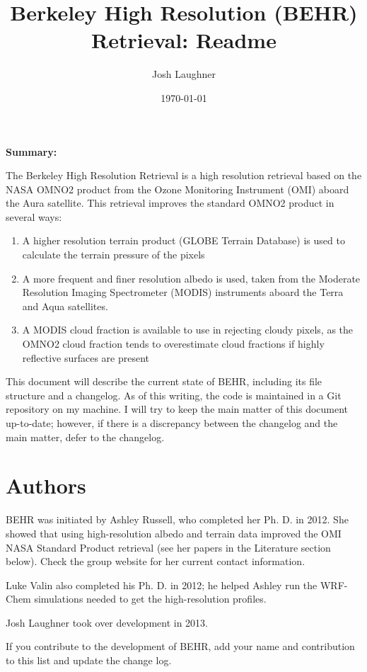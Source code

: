 \documentclass[12pt]{article}
\title{\textbf{Be}rkeley \textbf{H}igh \textbf{R}esolution (\textbf{BEHR}) Retrieval: Readme}
\author{Josh Laughner}
\date{\today}
\begin{document}
\maketitle

\noindent\textbf{Summary:}

	The Berkeley High Resolution Retrieval is a high resolution  retrieval based on the NASA OMNO2 product from the Ozone Monitoring Instrument (OMI) aboard the Aura satellite.  This  retrieval improves the standard OMNO2 product in several ways: 
	\begin{enumerate}
 	 \item A higher resolution terrain product (GLOBE Terrain Database) is used to calculate the terrain pressure of the pixels
	 \item A more frequent and finer resolution albedo is used, taken from the Moderate Resolution Imaging Spectrometer (MODIS) instruments aboard the Terra and Aqua satellites.
	 \item A MODIS cloud fraction is available to use in rejecting cloudy pixels, as the OMNO2 cloud fraction tends to overestimate cloud fractions if highly reflective surfaces are present
	\end{enumerate}
	
	This document will describe the current state of BEHR, including its file structure and a changelog.  As of this writing, the code is maintained in a Git repository on my machine.  I will try to keep the main matter of this document up-to-date; however, if there is a discrepancy between the changelog and the main matter, defer to the changelog.
	
\tableofcontents

\section{Authors}

	BEHR was initiated by Ashley Russell, who completed her Ph. D. in 2012.  She showed that using high-resolution albedo and terrain data improved the OMI NASA Standard Product retrieval (see her papers in the Literature section below).  Check the group website for her current contact information.
	
	Luke Valin also completed his Ph. D. in 2012; he helped Ashley run the WRF-Chem simulations needed to get the high-resolution  profiles.
	
	Josh Laughner took over development in 2013.
	
	If you contribute to the development of BEHR, add your name and contribution to this list and update the change log.
\end{document}
